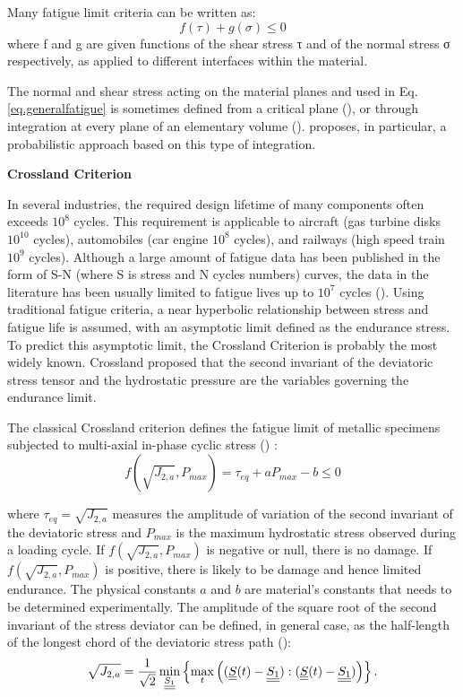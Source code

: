 Many fatigue limit criteria can be written as:
\begin{equation}
f(\tau)+g(\sigma) \leqslant 0
\label{eq.generalfatigue}
\end{equation}
where f and g are given functions of the shear stress τ and of the normal stress σ respectively, as applied to different interfaces within the material.  

The normal and shear stress acting on the material planes and used in Eq.\eqref{eq.generalfatigue} is sometimes defined from a critical plane (\cite{findley1959behavior}), or
through integration at every plane of an elementary volume (\cite{liu1993berechnung}). \cite{thu2008effet} proposes, in
particular, a probabilistic approach based on this type of integration.

\textbf{Crossland Criterion}

In several industries, the required design lifetime of many components often exceeds $ 10^8 $ cycles. This requirement is applicable to aircraft (gas turbine disks $ 10^{10} $ cycles), automobiles (car engine $ 10^8 $ cycles), and railways (high speed train $ 10^9 $ cycles). Although a large amount of fatigue data has been published in the form of S-N (where S is stress and N cycles numbers) curves, the data in the literature has been usually limited to fatigue lives up to $ 10^7 $ cycles (\cite{wachtman2009mechanical}). Using traditional fatigue criteria, a near hyperbolic relationship between stress and fatigue life is assumed, with an asymptotic limit defined as the endurance stress. To predict this asymptotic limit, the Crossland Criterion is probably the most widely known. Crossland proposed that the second invariant of the deviatoric stress tensor and the hydrostatic pressure are the variables governing the endurance limit. 

The classical Crossland criterion defines the fatigue limit of metallic specimens subjected to multi-axial in-phase cyclic stress (\cite{crossland1956effect}) : 
\begin{equation}f(\sqrt{J_{2,a}},P_{max})=\tau_{eq}+aP_{max}-b\leqslant 0\end{equation}

where $\tau_{eq}=\sqrt{J_{2,a}}$ measures  the amplitude of variation of the second invariant of the deviatoric stress  and $P_{max}$ is the maximum hydrostatic stress observed during a loading cycle. If $f(\sqrt{J_{2,a}},P_{max})$ is negative or null, there is no damage. If $f(\sqrt{J_{2,a}},P_{max})$ is positive, there is likely to be damage and hence limited endurance. The physical constants $a$ and $b$ are material's constants that needs to be determined experimentally. The amplitude of the square root of the second invariant of the stress deviator can be defined, in general case, as the half-length of the longest chord of the deviatoric stress path (\cite{Papadopoulos1997219}):
\begin{equation}\sqrt{J_{2,a}}=\frac{1}{\sqrt{2}}\min \limits_{\uline{\uline{S_1}}}\left\lbrace \max \limits_{t}\left( (\uline{\uline{S}}(t)-\uline{\uline{S_1}}):(\uline{\uline{S}}(t)-\uline{\uline{S_1}})\right)\right\rbrace .\end{equation}

